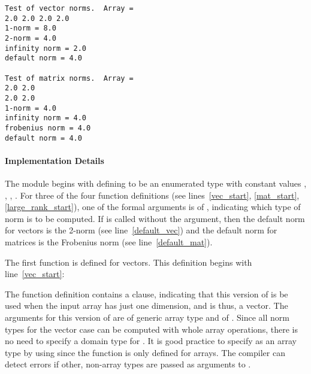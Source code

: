 {\small
\begin{verbatim}
Test of vector norms.  Array = 
2.0 2.0 2.0 2.0
1-norm = 8.0
2-norm = 4.0
infinity norm = 2.0
default norm = 4.0

Test of matrix norms.  Array = 
2.0 2.0
2.0 2.0
1-norm = 4.0
infinity norm = 4.0
frobenius norm = 4.0
default norm = 4.0
\end{verbatim}}

\paragraph{Implementation Details}
The  module begins with defining  to be an
enumerated type with constant values , , 
, .
For three of the four  function definitions (see lines~\ref{vec_start},
\ref{mat_start}, \ref{large_rank_start}), 
one of the formal arguments is of , indicating which type of norm 
is to be computed.  If  is called without the  argument,
then the default norm for vectors is the 2-norm (see line~\ref{default_vec}) and 
the default norm for matrices is the Frobenius norm (see line~\ref{default_mat}).  

The first  function is defined for vectors.  This definition
begins with line~\ref{vec_start}:
\begin{chapel}
  def norm(x: [], p: normType) where x.rank == 1 {
\end{chapel}
The function definition contains a  clause, indicating that
this version of  is be used when the input array 
has just one dimension, and is thus, a vector.  The arguments for this version
of  are  of generic array type and  of .  
Since all norm types for the vector case can be computed with whole array 
operations, there 
is no need to specify a domain type for .  It is good practice to
specify  as an array type by using \chpl{: []} since the 
function is only defined for arrays.  The compiler can detect errors if other,
non-array types are passed as arguments to .

